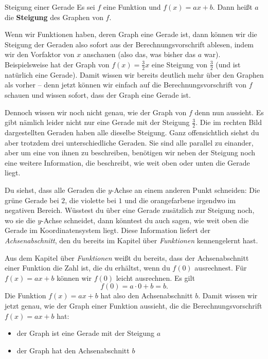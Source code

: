 \documentclass[../../main.tex]{subfiles}
\begin{document}
\begin{definition}{Steigung einer Gerade}
    Es sei $f$ eine Funktion und $f(x)=ax+b$. Dann heißt $a$ die \textbf{Steigung} des Graphen von $f$.
\end{definition}

Wenn wir Funktionen haben, deren Graph eine Gerade ist, dann können wir die Steigung der Geraden also sofort aus der Berechnungsvorschrift ablesen, indem wir den Vorfaktor von $x$ anschauen (also das, was bisher das $a$ war). Beispielsweise hat der Graph von $f(x)=\frac{3}{2}x$ eine Steigung von $\frac{3}{2}$ (und ist natürlich eine Gerade). Damit wissen wir bereits deutlich mehr über den Graphen als vorher -- denn jetzt können wir einfach auf die Berechnungsvorschrift von $f$ schauen und wissen sofort, dass der Graph eine Gerade ist.

Dennoch wissen wir noch nicht genau, wie der Graph von $f$ denn nun aussieht. Es gibt nämlich leider nicht nur eine Gerade mit der Steigung $\frac{3}{2}$. Die im rechten Bild dargestellten Geraden haben alle dieselbe Steigung. Ganz offensichtlich siehst du aber trotzdem drei unterschiedliche Geraden. Sie sind alle parallel zu einander, aber um eine von ihnen zu beschreiben, benötigen wir neben der Steigung noch eine weitere Information, die beschreibt, wie weit oben oder unten die Gerade liegt. 

Du siehst, dass alle Geraden die $y$-Achse an einem anderen Punkt schneiden: Die grüne Gerade bei $2$, die violette bei $1$ und die orangefarbene irgendwo im negativen Bereich. Wüsstest du über eine Gerade zusätzlich zur Steigung noch, wo sie die $y$-Achse schneidet, dann könntest du auch sagen, wie weit oben die Gerade im Koordinatensystem liegt. Diese Information liefert der \emph{Achsenabschnitt}, den du bereits im Kapitel über \emph{Funktionen} kennengelernt hast.

Aus dem Kapitel über \emph{Funktionen} weißt du bereits, dass der Achsenabschnitt einer Funktion die Zahl ist, die du erhältst, wenn du $f(0)$ ausrechnest. Für $f(x)=ax+b$ können wir $f(0)$ leicht ausrechnen. Es gilt
\[f(0)=a\cdot 0+b=b.\]
Die Funktion $f(x)=ax+b$ hat also den Achsenabschnitt $b$. Damit wissen wir jetzt genau, wie der Graph einer Funktion aussieht, die die Berechnungsvorschrift $f(x)=ax+b$ hat:
\begin{itemize}
    \item der Graph ist eine Gerade mit der Steigung $a$
    \item der Graph hat den Achsenabschnitt $b$
\end{itemize}
\end{document}
